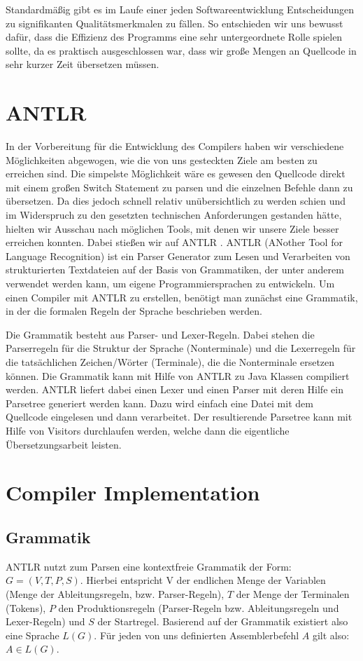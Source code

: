 \documentclass[paper=a4,fontsize=11pt,twocolumn]{scrreprt}
\begin{document}
Standardmäßig gibt es im Laufe einer jeden Softwareentwicklung Entscheidungen zu signifikanten Qualitätsmerkmalen zu fällen.
So entschieden wir uns bewusst dafür, dass die Effizienz des Programms eine sehr untergeordnete Rolle spielen sollte, da es praktisch ausgeschlossen war, dass wir große Mengen an Quellcode in sehr kurzer Zeit übersetzen müssen.

\section{ANTLR}
\label{sec:antlr}

In der Vorbereitung für die Entwicklung des Compilers haben wir verschiedene Möglichkeiten abgewogen, wie die von uns gesteckten Ziele am besten zu erreichen sind.
Die simpelste Möglichkeit wäre es gewesen den Quellcode direkt mit einem großen Switch Statement zu parsen und die einzelnen Befehle dann zu übersetzen.
Da dies jedoch schnell relativ unübersichtlich zu werden schien und im Widerspruch zu den gesetzten technischen Anforderungen gestanden hätte, hielten wir Ausschau nach möglichen Tools, mit denen wir unsere Ziele besser erreichen konnten.
Dabei stießen wir auf ANTLR \autocite{ANTLR}.
ANTLR (ANother Tool for Language Recognition) ist ein Parser Generator zum Lesen und Verarbeiten von strukturierten Textdateien auf der Basis von Grammatiken, der unter anderem verwendet werden kann, um eigene Programmiersprachen zu entwickeln.
Um einen Compiler mit ANTLR zu erstellen, benötigt man zunächst eine Grammatik, in der die formalen Regeln der Sprache beschrieben werden.

Die Grammatik besteht aus Parser- und Lexer-Regeln.
Dabei stehen die Parserregeln für die Struktur der Sprache (Nonterminale) und die Lexerregeln für die tatsächlichen Zeichen/Wörter (Terminale), die die Nonterminale ersetzen können.
Die Grammatik kann mit Hilfe von ANTLR zu Java Klassen compiliert werden.
ANTLR liefert dabei einen Lexer und einen Parser mit deren Hilfe ein Parsetree generiert werden kann.
Dazu wird einfach eine Datei mit dem Quellcode eingelesen und dann verarbeitet.
Der resultierende Parsetree kann mit Hilfe von Visitors durchlaufen werden,
welche dann die eigentliche Übersetzungsarbeit leisten.

\section{Compiler Implementation}
\label{sec:compiler_implementation}

\subsection{Grammatik}
\label{subsec:grammatik}
ANTLR nutzt zum Parsen eine kontextfreie Grammatik der Form: $G = (V, T, P, S)$.
Hierbei entspricht V der endlichen Menge der Variablen (Menge der Ableitungsregeln, bzw. Parser-Regeln), $T$ der Menge der Terminalen (Tokens), $P$ den Produktionsregeln (Parser-Regeln bzw. Ableitungsregeln und Lexer-Regeln) und $S$ der Startregel.
Basierend auf der Grammatik existiert also eine Sprache $L(G)$. Für jeden von uns definierten Assemblerbefehl $A$ gilt also: $A \in L(G)$. 
\end{document}
